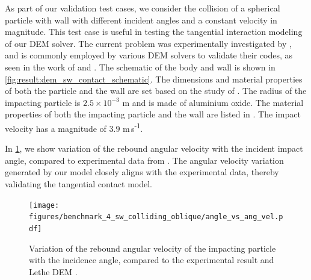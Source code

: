 \documentclass[preprint,12pt]{elsarticle}
\begin{document}
As part of our validation test cases, we consider the collision of a spherical
particle with wall with different incident angles and a constant velocity in
magnitude. This test case is useful in testing the tangential interaction
modeling of our DEM solver.  The current problem was experimentally
investigated by \citet{kharaz2001experimental}, and is commonly employed by
various DEM solvers to validate their codes, as seen in the work of
\cite{di2004comparison} and \cite{golshan2023lethe}.  The schematic of the
body and wall is shown in \cref{fig:result:dem_sw_contact_schematic}.  The
dimensions and material properties of both the particle and the wall are set
based on the study of \cite{di2004comparison,kharaz2001experimental}. The
radius of the impacting particle is $2.5 \times 10^{-3}$ m and is made of aluminium
oxide. The material properties of both the impacting particle and the wall are
listed in .  The impact velocity has a magnitude of
$3.9$ m\,s\textsuperscript{-1}.


In \cref{fig:result:dem_sw_contact_omega_vs_theta}, we show variation of the
rebound angular velocity with the incident impact angle, compared to
experimental data from \citet{kharaz2001experimental}.  The angular velocity
variation generated by our model closely aligns with the
experimental data, thereby validating the tangential
contact model.
\begin{figure}[!htpb]
  \centering
  \texttt{[image: figures/benchmark\_4\_sw\_colliding\_oblique/angle\_vs\_ang\_vel.pdf]}
  \caption{Variation of the rebound angular velocity of the impacting particle
    with the incidence angle, compared to the experimental result and Lethe DEM \cite{golshan2023lethe}.}
  \label{fig:result:dem_sw_contact_omega_vs_theta}
\end{figure}


\FloatBarrier%
\end{document}
